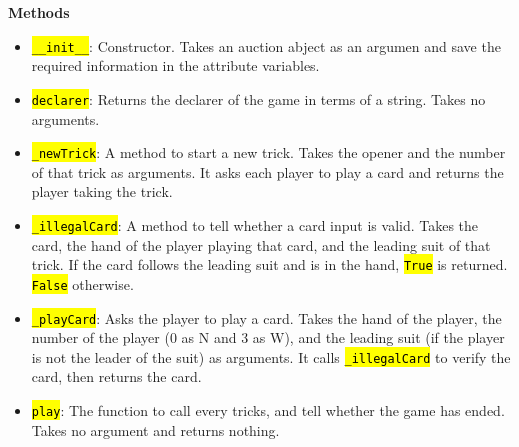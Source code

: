 \documentclass[12pt]{article}
\newcommand{\code}[1]{\texttt{\hl{#1}}}
\begin{document}
\textbf{Methods}
\begin{itemize}
	\item \code{\_\_init\_\_}: Constructor. Takes an auction abject as an argumen
		and save the required information in the attribute variables.
	\item \code{declarer}: Returns the declarer of the game in terms of a string.
		Takes no arguments.
	\item \code{\_newTrick}: A method to start a new trick. Takes the opener
		and the number of that trick as arguments. It asks each player to play
		a card and returns the player taking the trick.
	\item \code{\_illegalCard}: A method to tell whether a card input is valid.
		Takes the card, the hand of the player playing that card, and the leading
		suit of that trick. If the card follows the leading suit and is in the
		hand, \code{True} is returned. \code{False} otherwise. 
	\item \code{\_playCard}: Asks the player to play a card. Takes the hand of
		the player, the number of the player (0 as N and 3 as W), and the leading
		suit (if the player is not the leader of the suit) as arguments. It calls
		\code{\_illegalCard} to verify the card, then returns the card.
	\item \code{play}: The function to call every tricks, and tell whether the
		game has ended. Takes no argument and returns nothing.
	
	
\end{itemize}
\end{document}
